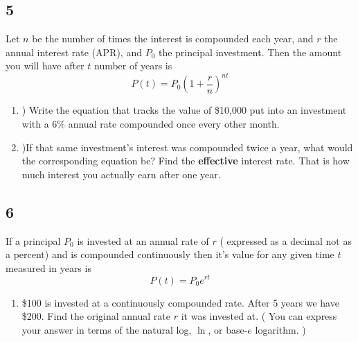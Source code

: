 \documentclass[11pt]{amsart}
\begin{document}
\newpage
\subsection*{5} Let $n$ be the number of times the interest is compounded each year,
and $r$ the annual interest rate (APR), and $P_0$ the principal investment.  Then the amount you will have after $t$ number of years is
$$ P(t) = P_0 \left( 1+\frac{r}{n}\right)^{nt} $$
\begin{enumerate}[a]
\item) Write the equation that tracks the value of \$10,000 put into an investment with a 6\% annual rate compounded once every other month. 
\item )If that same investment's interest was compounded twice a year, what would the corresponding equation be? Find the {\bf effective} interest
rate. That is how much interest you actually earn after one year. 
\end{enumerate}

\vspace{7cm}

\subsection*{6} %
If a principal $P_0$ is invested at an annual rate of $r$ ( expressed as a decimal not as a percent) and is compounded 
continuously then it's value for any given time $t$ measured in years is 
$$P(t) = P_0e^{rt}$$
\begin{enumerate}[a]
\item \$100 is invested at a continuously compounded rate. After 5 years we have \$200.  Find the original annual rate $r$
it was invested at.  ( You can express your answer in terms of the natural log, $\ln$, or base-$e$ logarithm. ) \
\end{enumerate}
\end{document}
